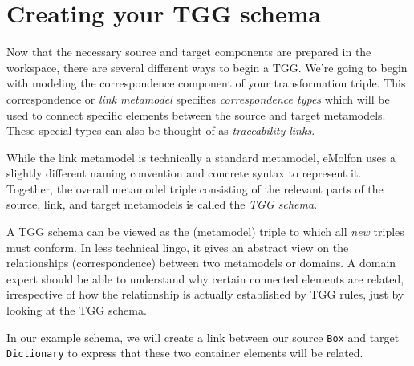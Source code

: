 \newpage
\hypertarget{TGGSchema}{}
\section{Creating your TGG schema}
\genHeader

Now that the necessary source and target components are prepared in the workspace, there are several different ways to begin a TGG. We're going to begin with
modeling the correspondence component of your transformation triple. This correspondence or \emph{link metamodel} specifies
\emph{correspondence types} which will be used to connect specific elements between the source and target metamodels. These special
types can also be thought of as \emph{traceability links}.

While the link metamodel is technically a standard metamodel, eMolfon uses a slightly different naming convention and concrete syntax to represent it.
Together, the overall metamodel triple consisting of the relevant parts of the source, link, and target metamodels is called the \emph{TGG schema}.

A TGG schema can be viewed as the (metamodel) triple to which all \emph{new} triples must conform. In less technical lingo, it gives an abstract view on the
relationships (correspondence) between two metamodels or domains. A domain expert should be able to understand why certain connected elements are related,
irrespective of how the relationship is actually established by TGG rules, just by looking at the TGG schema. 


In our example schema, we will create a link between our source \texttt{Box} and target \texttt{Dictionary} to express that these two container elements will be
related.





